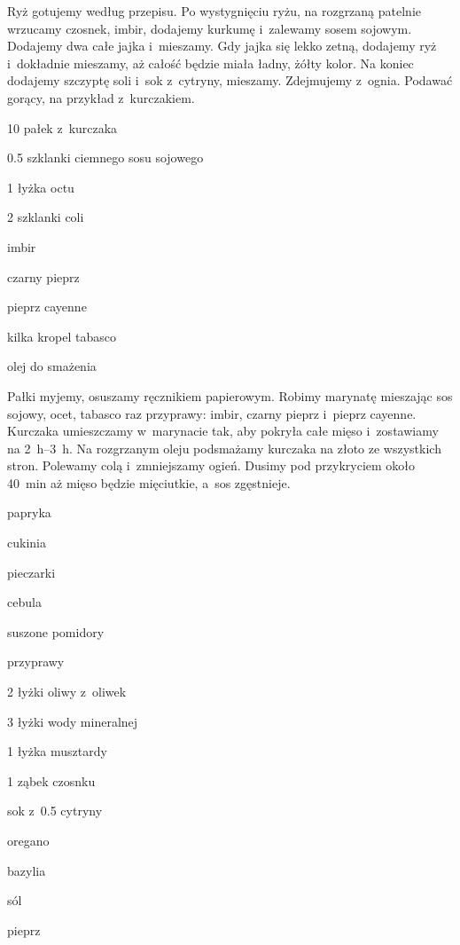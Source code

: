 \documentclass[../kucharek.tex]{subfiles}
\begin{document}
Ryż gotujemy według przepisu. Po wystygnięciu ryżu, na rozgrzaną patelnie
wrzucamy czosnek, imbir, dodajemy kurkumę i~zalewamy sosem sojowym. Dodajemy
dwa całe jajka i~mieszamy. Gdy jajka się lekko zetną, dodajemy ryż i~dokładnie
mieszamy, aż całość będzie miała ładny, żółty kolor. Na koniec dodajemy
szczyptę soli i~sok z~cytryny, mieszamy. Zdejmujemy z~ognia. Podawać gorący, na
przykład z~kurczakiem.


\begin{Ingred}
    \item \num{10} pałek z~kurczaka
    \item \num{0.5} szklanki ciemnego sosu sojowego
    \item \num{1} łyżka octu
    \item \num{2} szklanki coli
    \item imbir
    \item czarny pieprz
    \item pieprz cayenne
    \item kilka kropel tabasco
    \item olej do smażenia
\end{Ingred}

Pałki myjemy, osuszamy ręcznikiem papierowym. Robimy marynatę mieszając sos
sojowy, ocet, tabasco raz przyprawy: imbir, czarny pieprz i~pieprz cayenne.
Kurczaka umieszczamy w~marynacie tak, aby pokryła całe mięso i~zostawiamy na
\qtyrange{2}{3}{\hour}. Na rozgrzanym oleju podsmażamy kurczaka na złoto ze
wszystkich stron. Polewamy colą i~zmniejszamy ogień. Dusimy pod przykryciem
około \qty{40}{\minute} aż mięso będzie mięciutkie, a~sos zgęstnieje.


\begin{Ingred}
    \item papryka
    \item cukinia
    \item pieczarki
    \item cebula
    \item suszone pomidory
    \item przyprawy
\end{Ingred}

\begin{Ingred}[sos]
    \item \num{2} łyżki oliwy z~oliwek
    \item \num{3} łyżki wody mineralnej
    \item \num{1} łyżka musztardy
    \item \num{1} ząbek czosnku
    \item sok z~\num{0.5} cytryny
    \item oregano
    \item bazylia
    \item sól
    \item pieprz
\end{Ingred}
\end{document}

